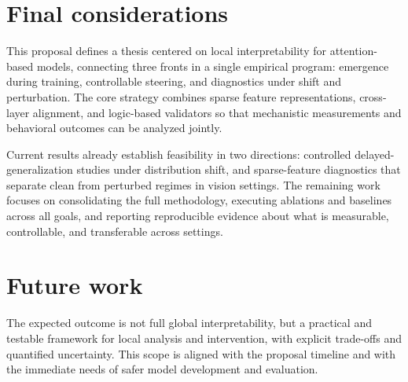 \documentclass[../ppgc-tese.tex]{subfiles}
\begin{document}
\section*{Final considerations}
This proposal defines a thesis centered on local interpretability for attention-based models, connecting three fronts in a single empirical program: emergence during training, controllable steering, and diagnostics under shift and perturbation. The core strategy combines sparse feature representations, cross-layer alignment, and logic-based validators so that mechanistic measurements and behavioral outcomes can be analyzed jointly.

Current results already establish feasibility in two directions: controlled delayed-generalization studies under distribution shift, and sparse-feature diagnostics that separate clean from perturbed regimes in vision settings. The remaining work focuses on consolidating the full methodology, executing ablations and baselines across all goals, and reporting reproducible evidence about what is measurable, controllable, and transferable across settings.


\section*{Future work}


The expected outcome is not full global interpretability, but a practical and testable framework for local analysis and intervention, with explicit trade-offs and quantified uncertainty. This scope is aligned with the proposal timeline and with the immediate needs of safer model development and evaluation.
\end{document}
